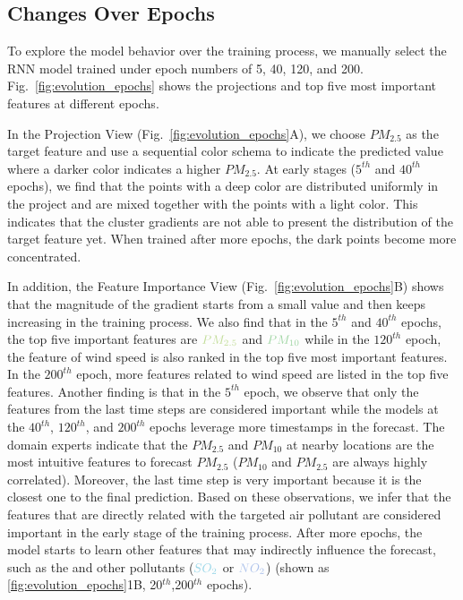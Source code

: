 \subsection{Changes Over Epochs}
To explore the model behavior over the training process, we manually select the RNN model trained under epoch numbers of 5, 40, 120, and 200. Fig.~\ref{fig:evolution_epochs} shows the projections and top five most important features at different epochs.

In the Projection View (Fig.~\ref{fig:evolution_epochs}A), we choose $PM_{2.5}$ as the target feature and use a sequential color schema to indicate the predicted value where a darker color indicates a higher $PM_{2.5}$. 
At early stages ($5^{th}$ and $40^{th}$ epochs), we find that the points with a deep color are distributed uniformly in the project and are mixed together with the points with a light color. 
This indicates that the cluster gradients are not able to present the distribution of the target feature yet.
When trained after more epochs, the dark points become more concentrated. 

In addition, the Feature Importance View (Fig.~\ref{fig:evolution_epochs}B) shows that the magnitude of the gradient starts from a small value and then keeps increasing in the training process. 
We also find that in the $5^{th}$ and $40^{th}$ epochs, the top five important features are $\color{PM25Color}{PM_{2.5}}$ and $\color{PM10Color}{PM_{10}}$ while in the $120^{th}$ epoch, the feature of wind speed is also ranked in the top five most important features. 
In the $200^{th}$ epoch, more features related to wind speed are listed in the top five features.
Another finding is that in the $5^{th}$ epoch, we observe that only the features from the last time steps are considered important while the models at the $40^{th}$, $120^{th}$, and $200^{th}$ epochs leverage more timestamps in the forecast.  
The domain experts indicate that the $PM_{2.5}$ and $PM_{10}$ at nearby locations are the most intuitive features to forecast $PM_{2.5}$ ($PM_{10}$ and $PM_{2.5}$ are always highly correlated).
Moreover, the last time step is very important because it is the closest one to the final prediction. 
Based on these observations, we infer that the features that are directly related with the targeted air pollutant are considered important in the early stage of the training process.
After more epochs, the model starts to learn other features that may indirectly influence the forecast, such as the \textit{\color{WINDColor}{Wind Speed}} and other pollutants ($\color{SO2Color}{SO_2}$ or $\color{NO2Color}{NO_2}$) (shown as \ref{fig:evolution_epochs}1B, 20$^{th}$,200$^{th}$ epochs). 

